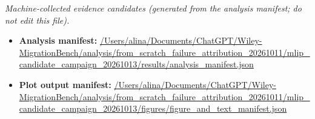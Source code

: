 \emph{Machine-collected evidence candidates (generated from the analysis manifest; do not edit this file).}
\begin{itemize}[leftmargin=1.4em,noitemsep]
\item \textbf{Analysis manifest:} \url{/Users/alina/Documents/ChatGPT/Wiley-MigrationBench/analysis/from_scratch_failure_attribution_20261011/mlip_candidate_campaign_20261013/results/analysis_manifest.json}
\item \textbf{Plot output manifest:} \url{/Users/alina/Documents/ChatGPT/Wiley-MigrationBench/analysis/from_scratch_failure_attribution_20261011/mlip_candidate_campaign_20261013/figures/figure_and_text_manifest.json}
\end{itemize}
